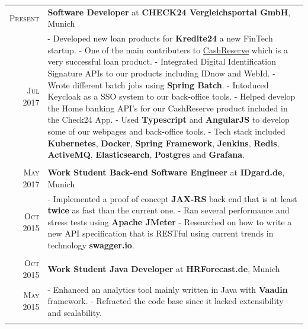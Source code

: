\documentclass[a4paper,13pt]{article}
\begin{document}
\begin{adjustwidth}{-3cm}{}
\begin{tabular}{r|p{17.5cm}}
				\textsc{Present} & \textbf{Software Developer} at \textbf{CHECK24 Vergleichsportal GmbH}, Munich \\
		\textsc{Jul 2017} & \footnotesize{
				- Developed new loan products for \textbf{Kredite24} a new FinTech startup.\newline
			- One of the main contributers to \href{https://www.check24.de/cashreserve/}{CashReserve} which is a very successful loan product. \newline
- Integrated Digital Identification Signature APIs to our products including IDnow and WebId. \newline
			- Wrote different batch jobs using \textbf{Spring Batch}. \newline
						- Intoduced Keycloak as a SSO system to our back-office tools. \newline
			- Helped develop the Home banking API's for our CashReserve product included in the Check24 App. \newline
			- Used \textbf{Typescript} and \textbf{AngularJS} to develop some of our webpages and back-office tools. \newline
			- Tech stack included \textbf{Kubernetes}, \textbf{Docker}, \textbf{Spring Framework}, \textbf{Jenkins}, \textbf{Redis}, \textbf{ActiveMQ}, \textbf{Elasticsearch}, \textbf{Postgres}
		 \newline
		 and \textbf{Grafana}.
	}
		\\ \multicolumn{2}{c}{}\\
		
\textsc{May 2017} & \textbf{Work Student Back-end Software Engineer} at \textbf{IDgard.de}, Munich \\
\textsc{Oct 2015} & \footnotesize{
	- Implemented a proof of concept \textbf{JAX-RS} back end that is at least \textbf{twice} as fast than the current one.\newline
	- Ran several performance and stress tests using \textbf{Apache JMeter} \newline
	- Researched on how to write a new API specification that is RESTful using current trends in technology \textbf{swagger.io}.
}
\\ \multicolumn{2}{c}{}\\


\textsc{Oct 2015} & \textbf{Work Student Java Developer} at \textbf{HRForecast.de}, Munich \\
\textsc{May 2015} & \footnotesize{ - Enhanced an analytics tool mainly written in Java with \textbf{Vaadin} framework. \newline
- Refracted the code base since it lacked extensibility and scalability.
} \\ 
\multicolumn{2}{c}{} \\


\end{tabular}
\end{adjustwidth}
\end{document}
